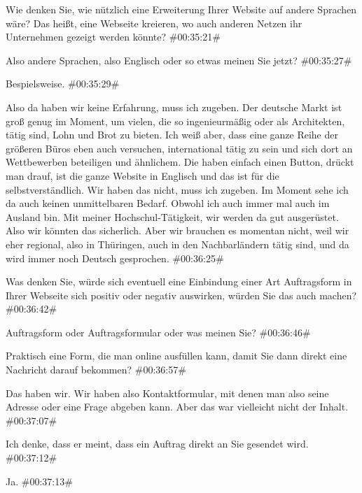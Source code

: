 \documentclass[a4paper, 12pt]{scrartcl}
\begin{document}
\begin{description}
\Toni Wie denken Sie, wie nützlich eine Erweiterung Ihrer Website auf andere Sprachen wäre? Das heißt, eine Webseite kreieren, wo auch anderen Netzen ihr Unternehmen gezeigt werden könnte? \#00:35:21\#

\Andre Also andere Sprachen, also Englisch oder so etwas meinen Sie jetzt? \#00:35:27\#

\Toni Bespielsweise. \#00:35:29\#

\Andre Also da haben wir keine Erfahrung, muss ich zugeben. Der deutsche Markt ist groß genug im Moment, um vielen, die so ingenieurmäßig oder als Architekten, tätig sind, Lohn und Brot zu bieten. Ich weiß aber, dass eine ganze Reihe der größeren Büros eben auch versuchen, international tätig zu sein und sich dort an Wettbewerben beteiligen und ähnlichem. Die haben einfach einen Button, drückt man drauf, ist die ganze Website in Englisch und das ist für die selbstverständlich. Wir haben das nicht, muss ich zugeben. Im Moment sehe ich da auch keinen unmittelbaren Bedarf. Obwohl ich auch immer mal auch im Ausland bin. Mit meiner Hochschul-Tätigkeit, wir werden da gut ausgerüstet. Also wir könnten das sicherlich. Aber wir brauchen es momentan nicht, weil wir eher regional, also in Thüringen, auch in den Nachbarländern tätig sind, und da wird immer noch Deutsch gesprochen. \#00:36:25\#

\Toni Was denken Sie, würde sich eventuell eine Einbindung einer Art Auftragsform in Ihrer Webseite sich positiv oder negativ auswirken, würden Sie das auch machen? \#00:36:42\#

\Andre Auftragsform oder Auftragsformular oder was meinen Sie? \#00:36:46\#

\Toni Praktisch eine Form, die man online ausfüllen kann, damit Sie dann direkt eine Nachricht darauf bekommen? \#00:36:57\#

\Andre Das haben wir. Wir haben also Kontaktformular, mit denen man also seine Adresse oder eine Frage abgeben kann. Aber das war vielleicht nicht der Inhalt. \#00:37:07\#

\Fabian Ich denke, dass er meint, dass ein Auftrag direkt an Sie gesendet wird. \#00:37:12\#

\Toni Ja. \#00:37:13\#


\end{description}
\end{document}
